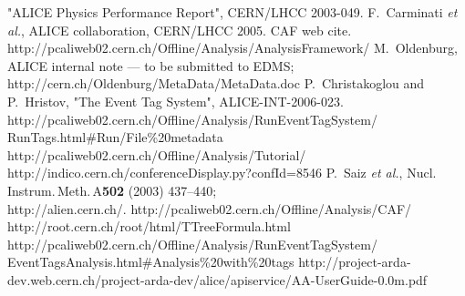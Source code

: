 \documentclass[12pt,a4paper,twoside]{article}
\begin{document}
\begin{thebibliography}{99}
 {"ALICE Physics Performance Report", CERN/LHCC 2003-049.}
 {F.\ Carminati \textit{et al.}, ALICE collaboration, CERN/LHCC 2005.}
 {CAF web cite.}
 {http://pcaliweb02.cern.ch/Offline/Analysis/AnalysisFramework/}
 {M.\ Oldenburg, ALICE internal note --- to be submitted to EDMS;\\
http://cern.ch/Oldenburg/MetaData/MetaData.doc}
 {P.\ Christakoglou and P.\ Hristov, "The Event Tag System", ALICE-INT-2006-023.}
 {http://pcaliweb02.cern.ch/Offline/Analysis/RunEventTagSystem/\\RunTags.html\#Run/File\%20metadata}
 {http://pcaliweb02.cern.ch/Offline/Analysis/Tutorial/\\
http://indico.cern.ch/conferenceDisplay.py?confId=8546}
 {
P.~Saiz \textit{et al.}, Nucl.\,Instrum.\,Meth.\,A\textbf{502} (2003) 437--440;\\ 
http://alien.cern.ch/.}
 {http://pcaliweb02.cern.ch/Offline/Analysis/CAF/}
 {http://root.cern.ch/root/html/TTreeFormula.html}
 {http://pcaliweb02.cern.ch/Offline/Analysis/RunEventTagSystem/\\EventTagsAnalysis.html\#Analysis\%20with\%20tags}
 {http://project-arda-dev.web.cern.ch/project-arda-dev/alice/apiservice/AA-UserGuide-0.0m.pdf}
\end{thebibliography}
\end{document}
